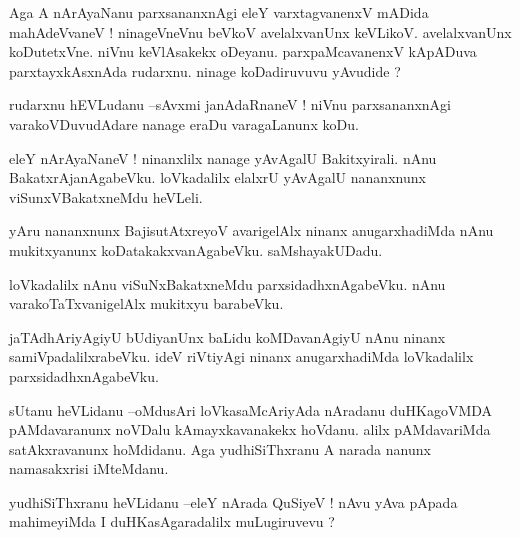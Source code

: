 \documentclass{article}
\begin{document}
\begin{mn}%
Aga A nArAyaNanu parxsananxnAgi eleY varxtagvanenxV mADida mahAdeVvaneV ! ninageVneVnu 
beVkoV avelalxvanUnx keVLikoV. avelalxvanUnx koDutetxVne. niVnu keVlAsakekx oDeyanu. 
parxpaMcavanenxV kApADuva parxtayxkAsxnAda rudarxnu. ninage koDadiruvuvu yAvudide ?
\end{mn}

\begin{mn}%
rudarxnu hEVLudanu --sAvxmi janAdaRnaneV ! niVnu parxsananxnAgi varakoVDuvudAdare nanage 
eraDu varagaLanunx koDu.
\end{mn}

\begin{mn}%
eleY nArAyaNaneV ! ninanxlilx nanage yAvAgalU Bakitxyirali. nAnu BakatxrAjanAgabeVku. 
loVkadalilx elalxrU yAvAgalU nananxnunx viSunxVBakatxneMdu heVLeli.
\end{mn}


\begin{mn}%
yAru nananxnunx BajisutAtxreyoV avarigelAlx ninanx anugarxhadiMda nAnu mukitxyanunx 
koDatakakxvanAgabeVku. saMshayakUDadu.
\end{mn}

\begin{mn}%
loVkadalilx nAnu viSuNxBakatxneMdu parxsidadhxnAgabeVku. nAnu varakoTaTxvanigelAlx mukitxyu 
barabeVku.
\end{mn}

\begin{mn}%
jaTAdhAriyAgiyU bUdiyanUnx baLidu koMDavanAgiyU nAnu ninanx samiVpadalilxrabeVku. ideV 
riVtiyAgi ninanx anugarxhadiMda loVkadalilx parxsidadhxnAgabeVku.
\end{mn}


\begin{mn}%
sUtanu heVLidanu --oMdusAri loVkasaMcAriyAda nAradanu duHKagoVMDA pAMdavaranunx noVDalu 
kAmayxkavanakekx hoVdanu. alilx pAMdavariMda satAkxravanunx hoMdidanu. Aga yudhiSiThxranu A 
narada nanunx namasakxrisi iMteMdanu.
\end{mn}

\begin{mn}%
yudhiSiThxranu heVLidanu --eleY nArada QuSiyeV ! nAvu yAva pApada mahimeyiMda I 
duHKasAgaradalilx muLugiruvevu ?
\end{mn}
\end{document}
